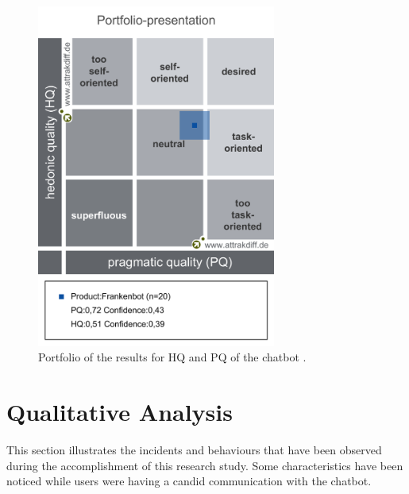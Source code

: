 \begin{figure}[!h]
    \centering
    \includegraphics[width=0.7\textwidth]{img/Portfolio_of_results.png}
    \caption{Portfolio of the results for HQ and PQ of the chatbot \cite{attrakdiff}.}
    \label{fig:portRes}
\end{figure}

\section{Qualitative Analysis}
This section illustrates the incidents and behaviours that have been observed during the accomplishment of this research study. Some characteristics have been noticed while users were having a candid communication with the chatbot.

